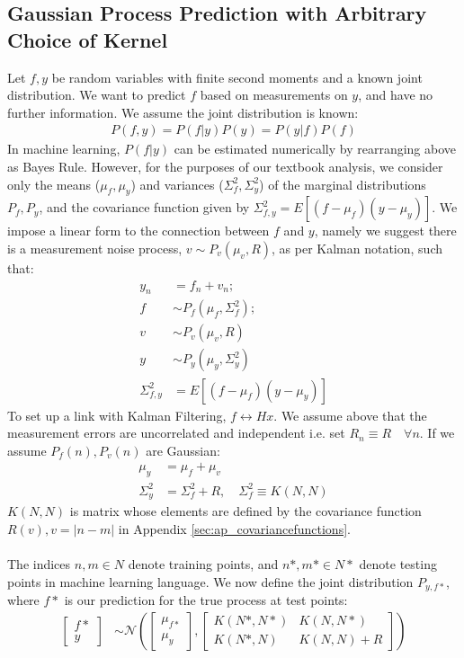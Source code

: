 \subsection{Gaussian Process Prediction with Arbitrary Choice of Kernel} \label{sec:ap_prediction:GPR}
Let $f,y$ be random variables with finite second moments and a known joint distribution. We want to predict $f$ based on measurements on $y$, and have no further information.
We assume the joint distribution is known:
\begin{align}
P(f,y) = P(f|y)P(y) = P(y|f)P(f) \label{eqn:GPR_productrule}
\end{align}
In machine learning, $P(f|y)$ can be estimated numerically by rearranging above as Bayes Rule. However, for the purposes of our textbook analysis, we consider only the means ($\mu_f, \mu_y$) and variances ($\Sigma^2_f, \Sigma^2_y$) of the marginal distributions $P_f,P_y$, and the covariance function given by $\Sigma^2_{f,y} = E[(f-\mu_f)(y-\mu_y)]$.  We impose a linear form to the connection between $f$ and $y$, namely we suggest there is a measurement noise process, $v \sim P_{v}(\mu_{v}, R)$, as per Kalman notation, such that:
\begin{align}
y_n &= f_n + v_n; \label{eqn:GPR_msmteqn} \\
f &\sim P_f(\mu_f, \Sigma^2_f); \\
v &\sim P_{v}(\mu_{v}, R) \\
y & \sim P_y(\mu_y, \Sigma^2_y) \\
\Sigma^2_{f,y}& = E[(f-\mu_f)(y-\mu_y)]
\end{align}
To set up a link with Kalman Filtering, $f \leftrightarrow Hx$. We assume above that the measurement errors are uncorrelated and independent i.e. set $R_n \equiv R \quad \forall n$. If we assume $P_{f}(n), P_{v}(n)$ are Gaussian:
\begin{align}
\mu_y &= \mu_f + \mu_{v}\\
\Sigma_y^2 &= \Sigma_f^2 + R , \quad \Sigma_f^2 \equiv K(N,N) 
\end{align}
$K(N,N)$ is matrix whose elements are defined by the covariance function $R(v), v=|n-m|$ in Appendix \ref{sec:ap_covariancefunctions}.
\\
\\
The indices $n,m \in N$ denote training points, and $n*,m* \in N*$ denote testing points in machine learning language. We now define the joint distribution $P_{y,f*}$, where $f*$ is our prediction for the true process at test points:
\begin{align}
\begin{bmatrix} f* \\y \end{bmatrix} & \sim \mathcal{N} (\begin{bmatrix} \mu_{f*} \\ \mu_y
\end{bmatrix} , \begin{bmatrix}   K(N*,N*)&K(N,N*) \\ K(N*,N) & K(N,N) + R \end{bmatrix} )
\end{align}
